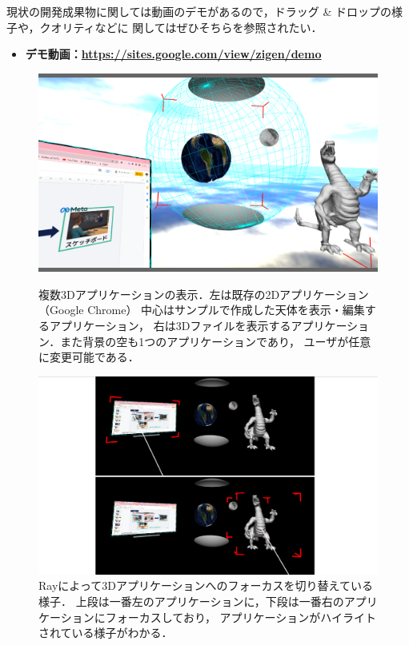 現状の開発成果物に関しては動画のデモがあるので，ドラッグ \& ドロップの様子や，クオリティなどに
関してはぜひそちらを参照されたい．
\begin{itemize}
  \item \textbf{デモ動画：\url{https://sites.google.com/view/zigen/demo}}
\end{itemize}

\begin{figure}[htbp]
  \begin{minipage}[t]{0.50\linewidth}
    \centering
    \includegraphics[keepaspectratio, width=\linewidth]{fig/multi-app.png}
    \caption{
      複数3Dアプリケーションの表示．左は既存の2Dアプリケーション（Google Chrome）
      中心はサンプルで作成した天体を表示・編集するアプリケーション，
      右は3Dファイルを表示するアプリケーション．また背景の空も1つのアプリケーションであり，
      ユーザが任意に変更可能である．
    }
    \label{fig:multi-app}
  \end{minipage}
  \begin{minipage}[t]{0.50\linewidth}
    \centering
    \includegraphics[keepaspectratio, width=\linewidth]{fig/ray-input.png}
    \caption{
      Rayによって3Dアプリケーションへのフォーカスを切り替えている様子．
      上段は一番左のアプリケーションに，下段は一番右のアプリケーションにフォーカスしており，
      アプリケーションがハイライトされている様子がわかる．
    }
    \label{fig:ray-input}
  \end{minipage}
\end{figure}

